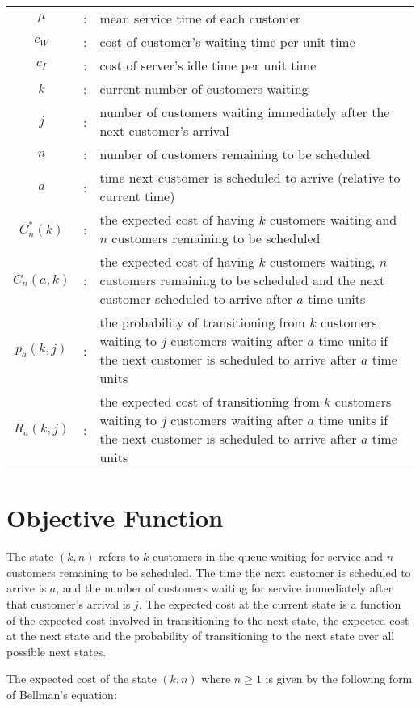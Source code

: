 \begin{tabularx}{\textwidth}{c c X}
	$\mu$ & : & mean service time of each customer \\
	$c_{W}$ & : & cost of customer's waiting time per unit time \\
	$c_{I}$ & : & cost of server's idle time per unit time \\
	$k$ & : & current number of customers waiting \\
	$j$ & : & number of customers waiting immediately after the next customer's arrival \\
	$n$ & : & number of customers remaining to be scheduled \\
	$a$ & : & time next customer is scheduled to arrive (relative to current time) \\
	$C_{n}^{*} (k)$ & : & the expected cost of having $k$ customers waiting and $n$ customers remaining to be scheduled \\
	$C_{n} (a, k)$ & : & the expected cost of having $k$ customers waiting, $n$ customers remaining to be scheduled and the next customer scheduled to arrive after $a$ time units \\
	$p_{a} (k, j)$ & : & the probability of transitioning from $k$ customers waiting to $j$ customers waiting after $a$ time units if the next customer is scheduled to arrive after $a$ time units \\
	$R_{a} (k, j)$ & : & the expected cost of transitioning from $k$ customers waiting to $j$ customers waiting after $a$ time units if the next customer is scheduled to arrive after $a$ time units
\end{tabularx}

\section{Objective Function}

The state $(k, n)$ refers to $k$ customers in the queue waiting for service and $n$ customers remaining to be scheduled. The time the next customer is scheduled to arrive is $a$, and the number of customers waiting for service immediately after that customer's arrival is $j$. The expected cost at the current state is a function of the expected cost involved in transitioning to the next state, the expected cost at the next state and the probability of transitioning to the next state over all possible next states. 

The expected cost of the state $(k, n)$ where $n \geq 1$ is given by the following form of Bellman's equation:

